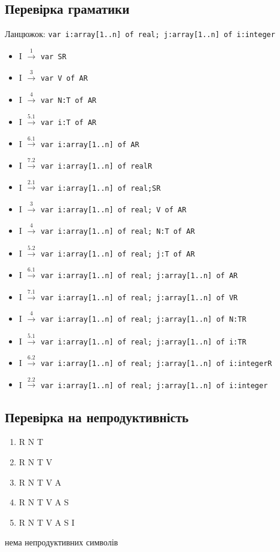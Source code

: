 \subsection{Перевірка граматики}
Ланцюжок: \verb|var i:array[1..n] of real; j:array[1..n] of i:integer|
\begin{itemize}
    \item[]  I $\xrightarrow{1}$ \verb|var SR|
    \item[]  I $\xrightarrow{3}$ \verb|var V of AR|
    \item[]  I $\xrightarrow{4}$ \verb|var N:T of AR|
    \item[]  I $\xrightarrow{5.1}$ \verb|var i:T of AR|
    \item[]  I $\xrightarrow{6.1}$ \verb|var i:array[1..n] of AR|
    \item[]  I $\xrightarrow{7.2}$ \verb|var i:array[1..n] of realR|
    \item[]  I $\xrightarrow{2.1}$ \verb|var i:array[1..n] of real;SR|
    \item[]  I $\xrightarrow{3}$ \verb|var i:array[1..n] of real; V of AR|
    \item[]  I $\xrightarrow{4}$ \verb|var i:array[1..n] of real; N:T of AR|
    \item[]  I $\xrightarrow{5.2}$ \verb|var i:array[1..n] of real; j:T of AR|
    \item[]  I $\xrightarrow{6.1}$ \verb|var i:array[1..n] of real; j:array[1..n] of AR|
    \item[]  I $\xrightarrow{7.1}$ \verb|var i:array[1..n] of real; j:array[1..n] of VR|
    \item[]  I $\xrightarrow{4}$ \verb|var i:array[1..n] of real; j:array[1..n] of N:TR|
    \item[]  I $\xrightarrow{5.1}$ \verb|var i:array[1..n] of real; j:array[1..n] of i:TR|
    \item[]  I $\xrightarrow{6.2}$ \verb|var i:array[1..n] of real; j:array[1..n] of i:integerR|
    \item[]  I $\xrightarrow{2.2}$ \verb|var i:array[1..n] of real; j:array[1..n] of i:integer|
\end{itemize}

\newpage
\subsection{Перевірка на непродуктивність}
\begin{enumerate}
    \item  R N T
    \item  R N T V
    \item  R N T V A
    \item  R N T V A S
    \item  R N T V A S I
\end{enumerate}
нема непродуктивних символів

